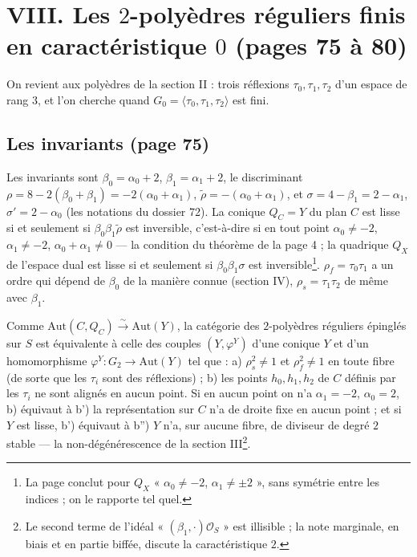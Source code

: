 \documentclass[11pt,a4paper]{article}
\begin{document}
\section*{VIII. Les $2$-polyèdres réguliers finis en caractéristique $0$ (pages 75 à 80)}

On revient aux polyèdres de la section II : trois réflexions $\tau_0, \tau_1,
\tau_2$ d'un espace de rang $3$, et l'on cherche quand $G_0 = \langle \tau_0,
\tau_1, \tau_2\rangle$ est fini.

\subsection*{Les invariants (page 75)}

Les invariants sont $\beta_0 = \alpha_0 + 2$, $\beta_1 = \alpha_1 + 2$, le
discriminant $\rho = 8 - 2(\beta_0 + \beta_1) = -2(\alpha_0 + \alpha_1)$,
$\tilde\rho = -(\alpha_0 + \alpha_1)$, et $\sigma = 4 - \beta_1 = 2 - \alpha_1$,
$\sigma' = 2 - \alpha_0$ (les notations du dossier 72). La conique $Q_C = Y$
du plan $C$ est lisse si et seulement si $\beta_0\beta_1\tilde\rho$ est
inversible, c'est-à-dire si en tout point $\alpha_0 \neq -2$, $\alpha_1 \neq -2$,
$\alpha_0 + \alpha_1 \neq 0$ --- la condition du théorème de la page 4 ; la
quadrique $Q_X$ de l'espace dual est lisse si et seulement si
$\beta_0\beta_1\sigma$ est inversible\footnote{La page conclut pour $Q_X$
« $\alpha_0 \neq -2$, $\alpha_1 \neq \pm 2$ », sans symétrie entre les indices ;
on le rapporte tel quel.}. $\rho_f = \tau_0\tau_1$ a un ordre qui dépend de
$\beta_0$ de la manière connue (section IV), $\rho_s = \tau_1\tau_2$ de même avec
$\beta_1$.

Comme $\mathrm{Aut}(C, Q_C) \xrightarrow{\sim} \mathrm{Aut}(Y)$, la catégorie des
$2$-polyèdres réguliers épinglés sur $S$ est équivalente à celle des couples
$(Y, \varphi^Y)$ d'une conique $Y$ et d'un homomorphisme $\varphi^Y : G_2 \to
\mathrm{Aut}(Y)$ tel que : a) $\rho_s^2 \neq 1$ et $\rho_f^2 \neq 1$ en toute
fibre (de sorte que les $\tau_i$ sont des réflexions) ; b) les points $h_0, h_1,
h_2$ de $C$ définis par les $\tau_i$ ne sont alignés en aucun point. Si en
aucun point on n'a $\alpha_1 = -2$, $\alpha_0 = 2$, b) équivaut à b') la
représentation sur $C$ n'a de droite fixe en aucun point ; et si $Y$ est lisse,
b') équivaut à b'') $Y$ n'a, sur aucune fibre, de diviseur de degré $2$
stable --- la non-dégénérescence de la section III\footnote{Le second terme de
l'idéal « $(\beta_1, \cdot)\mathcal{O}_S$ » est illisible ; la note marginale,
en biais et en partie biffée, discute la caractéristique $2$.}.
\end{document}

